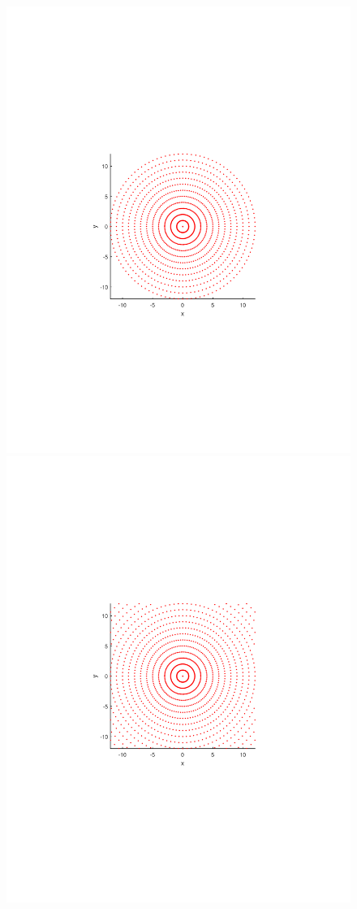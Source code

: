 \documentclass{UCF_ETD}
\begin{document}
 \begin{figure}[H]
 \begin{center}
 \includegraphics[scale=0.5]{PolarSphericalDFT/PurePolarGrid}
 \includegraphics[scale=0.5]{PolarSphericalDFT/PolarWithRadialCorner}

\end{center}
\end{figure}
\end{document}
